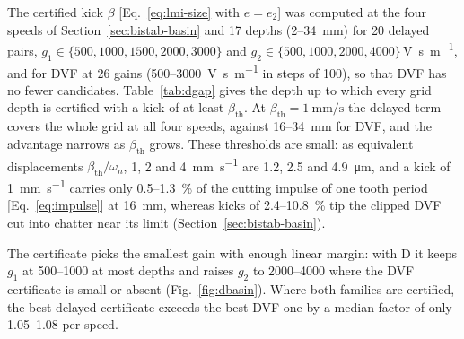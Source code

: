 The certified kick $\beta$ [Eq.~\eqref{eq:lmi-size} with $e=e_2$] was computed at the four speeds of Section~\ref{sec:bistab-basin} and 17 depths (2--\SI{34}{\milli\metre}) for 20 delayed pairs, $g_1\in\{500,1000,1500,2000,3000\}$ and $g_2\in\{500,1000,2000,4000\}$\,\si{\volt\second\per\metre}, and for DVF at 26 gains (500--\SI{3000}{\volt\second\per\metre} in steps of 100), so that DVF has no fewer candidates. Table~\ref{tab:dgap} gives the depth up to which every grid depth is certified with a kick of at least $\beta_{\mathrm{th}}$. At $\beta_{\mathrm{th}}=\SI{1}{\milli\metre\per\second}$ the delayed term covers the whole grid at all four speeds, against 16--\SI{34}{\milli\metre} for DVF, and the advantage narrows as $\beta_{\mathrm{th}}$ grows. These thresholds are small: as equivalent displacements $\beta_{\mathrm{th}}/\omega_n$, 1, 2 and \SI{4}{\milli\metre\per\second} are 1.2, 2.5 and \SI{4.9}{\micro\metre}, and a kick of \SI{1}{\milli\metre\per\second} carries only 0.5--\SI{1.3}{\percent} of the cutting impulse of one tooth period [Eq.~\eqref{eq:impulse}] at \SI{16}{\milli\metre}, whereas kicks of 2.4--\SI{10.8}{\percent} tip the clipped DVF cut into chatter near its limit (Section~\ref{sec:bistab-basin}).

The certificate picks the smallest gain with enough linear margin: with D it keeps $g_1$ at 500--1000 at most depths and raises $g_2$ to 2000--4000 where the DVF certificate is small or absent (Fig.~\ref{fig:dbasin}). Where both families are certified, the best delayed certificate exceeds the best DVF one by a median factor of only 1.05--1.08 per speed.

